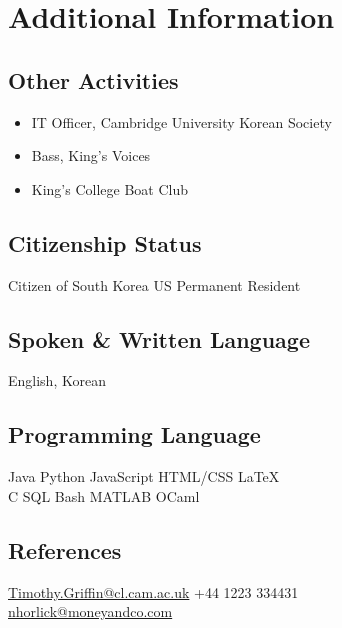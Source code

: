 \documentclass[]{deedy-resume-openfont}
\begin{document}
\section{Additional Information}
\begin{minipage}[t]{.45\textwidth}
\subsection{Other Activities}
\begin{itemize}[noitemsep]
\item IT Officer, Cambridge University Korean Society
\item Bass, King's Voices
\item King's College Boat Club
\end{itemize}
\subsection{Citizenship Status}
Citizen of South Korea \textbullet{} US Permanent Resident
\sectionsep
\subsection{Spoken \& Written Language}
 English, Korean
\sectionsep
\end{minipage}
\hfill
\begin{minipage}[t]{.45\textwidth}
\subsection{Programming Language}
Java \textbullet{} Python \textbullet{} JavaScript \textbullet{} HTML/CSS \textbullet{}  \LaTeX\ \\ 
C \textbullet{} SQL \textbullet{} Bash \textbullet{} MATLAB \textbullet{} OCaml
\sectionsep
\subsection{References}
\href{mailto:Timothy.Griffin@cl.cam.ac.uk}{Timothy.Griffin@cl.cam.ac.uk} \textbullet{} +44 1223 334431 \\
\href{mailto:nhorlick@moneyandco.com}{nhorlick@moneyandco.com} 
\sectionsep
\end{minipage}
\end{document}
